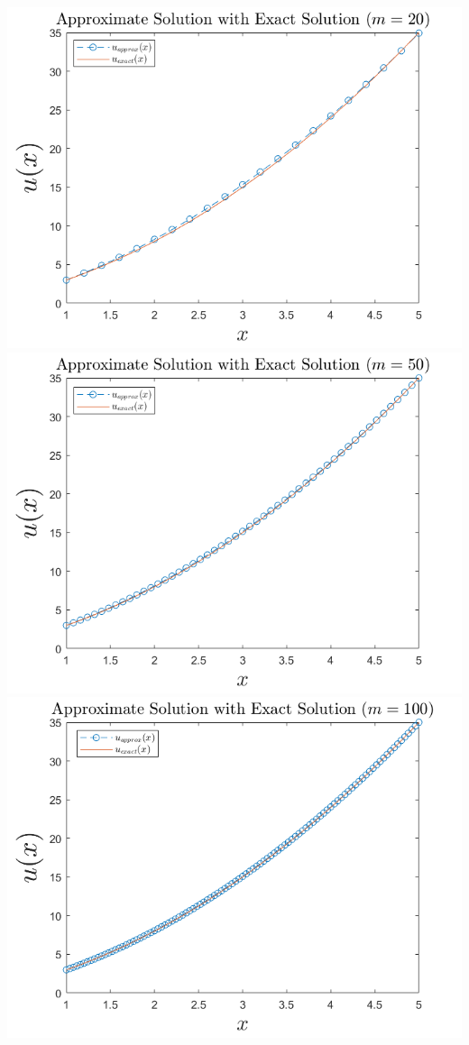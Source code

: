 \documentclass{article}
\begin{document}
\begin{enumerate}
\begin{center}
        \includegraphics[scale = 0.4]{3cm20.png}
        \newline
        \includegraphics[scale = 0.4]{3cm50.png}
        \includegraphics[scale = 0.4]{3cm100.png}
    \end{center}
    
\end{enumerate}
\end{document}
